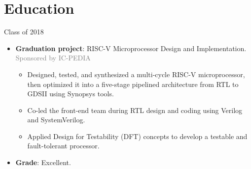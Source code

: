 \section{Education}

\begin{minipage}{\textwidth}
         {}{Class of 2018}

\begin{itemize}
  \item \textbf{Graduation project}: RISC-V Microprocessor Design and Implementation. \hfill \textcolor{gray}{\small Sponsored by IC-PEDIA}
  \begin{itemize}
    \item Designed, tested, and synthesized a multi-cycle RISC-V microprocessor, then optimized it into a five-stage pipelined architecture from RTL to GDSII using Synopsys tools.
    \item Co-led the front-end team during RTL design and coding using Verilog and SystemVerilog.
    \item Applied Design for Testability (DFT) concepts to develop a testable and fault-tolerant processor.
  \end{itemize}
  \item \textbf{Grade}: Excellent.
\end{itemize}
\end{minipage}
